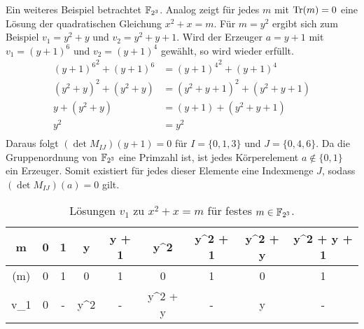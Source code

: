 Ein weiteres Beispiel betrachtet $\field{2}[3]$. Analog zeigt  für jedes $m$ mit $\mathrm{Tr}(m) = 0$ eine Lösung der quadratischen Gleichung $x^2+x=m$. Für $m=y^2$ ergibt sich zum Beispiel $v_1 = y^2 + y$ und $v_2 = y^2 + y + 1$. Wird der Erzeuger $a = y+1$ mit $v_1 = (y+1)^6$ und $v_2 = (y+1)^4$ gewählt, so wird wieder  erfüllt.
\begin{align*}
    {(y+1)^6}^2 + (y+1)^6 &= {(y+1)^4}^2 + (y+1)^4 \\
    (y^2 + y)^2 + (y^2 + y) &= (y^2 + y + 1)^2 + (y^2 + y + 1) \\
    y + (y^2 + y) &= (y+1) + (y^2 + y + 1) \\
    y^2 &= y^2 \\
\end{align*}
Daraus folgt $(\det M_{IJ})(y+1) = 0$ für $I = \{0,1,3\}$ und $J = \{0,4,6\}$.
Da die Gruppenordnung von $\field{2}[3]$ eine Primzahl ist, ist jedes Körperelement $a \notin \{0,1\}$ ein Erzeuger. Somit existiert für jedes dieser Elemente eine Indexmenge $J$, sodass $(\det M_{IJ})(a) = 0$ gilt.

{\renewcommand{\arraystretch}{1.5}
\begin{table}
    \centering
    \begin{tabular}{|C|C|C|C|C|C|C|C|C|}
    \hline
    m               & 0 & 1 & y & y + 1 & y^2 & y^2 + 1 & y^2 + y  & y^2 + y + 1 \\
    \hline
    (m)  & 0 & 1 & 0 & 1     & 0   & 1       & 0        & 1 \\
    \hline
    v_1         & 0 & - & y^2 & - & y^2 + y & - & y & - \\
    \hline
    \end{tabular}
    \caption{Lösungen $v_1$ zu $x^2 + x = m$ für festes $m \in \field{2}[3]$.} \label{table:sol_013F2_3}
\end{table}
}

